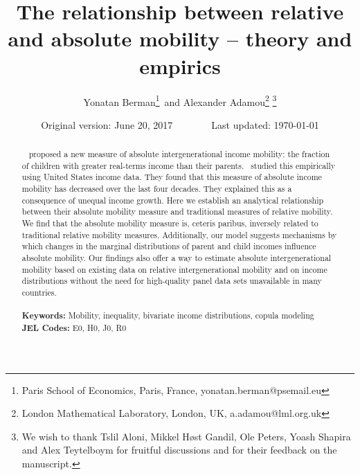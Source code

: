 \documentclass[12pt,a4paper]{article}
\numberwithin{equation}{section}
\begin{document}
\onehalfspacing

\begin{titlepage}
\title{The relationship between relative and absolute mobility -- theory and empirics}
\author{Yonatan Berman\footnote{Paris School of Economics, Paris, France, yonatan.berman@psemail.eu}\, and Alexander Adamou\footnote{London Mathematical Laboratory, London, UK, a.adamou@lml.org.uk} \thanks{We wish to thank Tslil Aloni, Mikkel H\o st Gandil, Ole Peters, Yoash Shapira and Alex Teytelboym for fruitful discussions and for their feedback on the manuscript.}}
\date{Original version: June 20, 2017\,\,\,\,\,\,\,\,\,\,\,\,\,\,\,\,\,\,\,\,\,\,\,\,Last updated: \today}
\maketitle
\begin{abstract}
\noindent~\citet{chetty2014land} proposed a new measure of absolute intergenerational income mobility: the fraction of children with greater real-terms income than their parents.~\citet{chetty2017fading} studied this empirically using United States income data. They found that this measure of absolute income mobility has decreased over the last four decades. %
They explained this as a consequence of unequal income growth. Here we establish an analytical relationship between their absolute mobility measure and traditional measures of relative mobility. %
We find that the absolute mobility measure is, ceteris paribus, inversely related to traditional relative mobility measures. Additionally, our model suggests mechanisms by which changes in the marginal distributions of parent and child incomes influence absolute mobility. Our findings also offer a way to estimate absolute intergenerational mobility based on existing data on relative intergenerational mobility and on income distributions without the need for high-quality panel data sets unavailable in many countries.
\\
\\
\noindent\textbf{Keywords:} Mobility, inequality, bivariate income distributions, copula modeling
\\
\noindent\textbf{JEL Codes:} E0, H0, J0, R0\\

\bigskip
\end{abstract}
\setcounter{page}{0}
\thispagestyle{empty}
\end{titlepage}
\pagebreak \newpage
\end{document}
